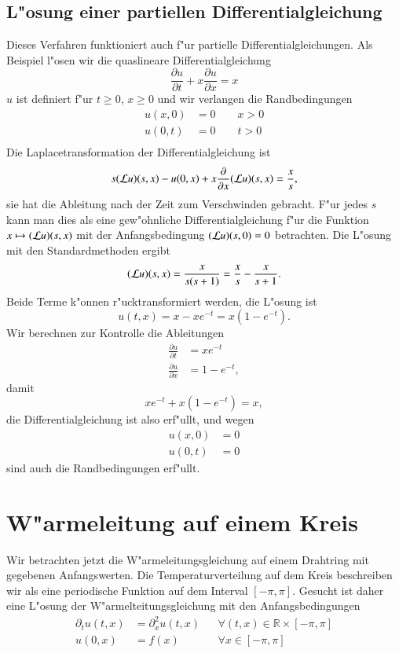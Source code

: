 \subsection{L"osung einer partiellen Differentialgleichung}
Dieses Verfahren funktioniert auch f"ur partielle Differentialgleichungen.
Als Beispiel l"osen wir die quaslineare Differentialgleichung
\[
\frac{\partial u}{\partial t}+x\frac{\partial u}{\partial x}=x
\]
$u$ ist definiert f"ur $t\ge0$, $x\ge 0$ und wir verlangen die Randbedingungen
\begin{align*}
u(x,0)&=0\qquad x>0\\
u(0,t)&=0\qquad t>0\\
\end{align*}
Die Laplacetransformation der Differentialgleichung ist
\[
s({\cal L}u)(s,x)-u(0,x)+x\frac{\partial}{\partial x}({\cal L}u)(s,x)=\frac{x}{s},
\]
sie hat die Ableitung nach der Zeit zum Verschwinden gebracht. F"ur jedes
$s$ kann man dies als eine gew"ohnliche Differentialgleichung f"ur die
Funktion $x\mapsto ({\cal L}u)(s,x)$ mit der Anfangsbedingung
$({\cal L}u)(s,0)=0$ betrachten.
Die L"osung mit den Standardmethoden 
ergibt
\[
({\cal L}u)(s,x)=\frac{x}{s(s+1)}=\frac{x}{s}-\frac{x}{s+1}.
\]
Beide Terme k"onnen r"ucktransformiert werden, die L"osung ist
\[
u(t,x)=x-xe^{-t}=x(1-e^{-t}).
\]
Wir berechnen zur Kontrolle die Ableitungen
\begin{align*}
\frac{\partial u}{\partial t}
&=
xe^{-t}
\\
\frac{\partial u}{\partial x}
&=
1-e^{-t},
\end{align*}
damit 
\[
xe^{-t}+x(1-e^{-t})=x,
\]
die Differentialgleichung ist also erf"ullt, und wegen
\begin{align*}
u(x,0)
&=
0
\\
u(0,t)
&=
0
\end{align*}
sind auch die Randbedingungen erf"ullt.

\section{W"armeleitung auf einem Kreis}
Wir betrachten jetzt die W"armeleitungsgleichung auf einem Drahtring
mit gegebenen Anfangswerten. Die Temperaturverteilung auf dem
Kreis beschreiben wir als eine periodische Funktion auf dem Interval
$[-\pi,\pi]$. Gesucht ist daher eine L"osung der W"armelteitungsgleichung
mit den Anfangsbedingungen
\begin{align*}
\partial_t u(t,x)&=\partial_x^2 u(t,x) &&\forall(t,x)\in\mathbb R\times[-\pi,\pi]\\
u(0,x)&=f(x)&& \forall x\in[-\pi,\pi]\\
\end{align*}

